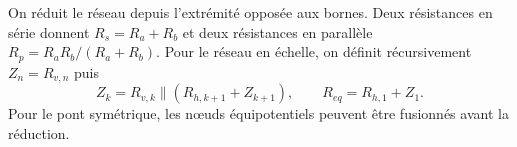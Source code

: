 \begin{corrigebox}
On réduit le réseau depuis l'extrémité opposée aux bornes. Deux
            résistances en série donnent $R_s=R_a+R_b$ et deux résistances en parallèle
            $R_p=R_aR_b/(R_a+R_b)$. Pour le réseau en échelle, on définit récursivement
            $Z_{n}=R_{v,n}$ puis
            \[Z_k=R_{v,k}\parallel(R_{h,k+1}+Z_{k+1}),\qquad
              R_{eq}=R_{h,1}+Z_1.\]
            Pour le pont symétrique, les nœuds équipotentiels peuvent être fusionnés avant
            la réduction.
\end{corrigebox}
